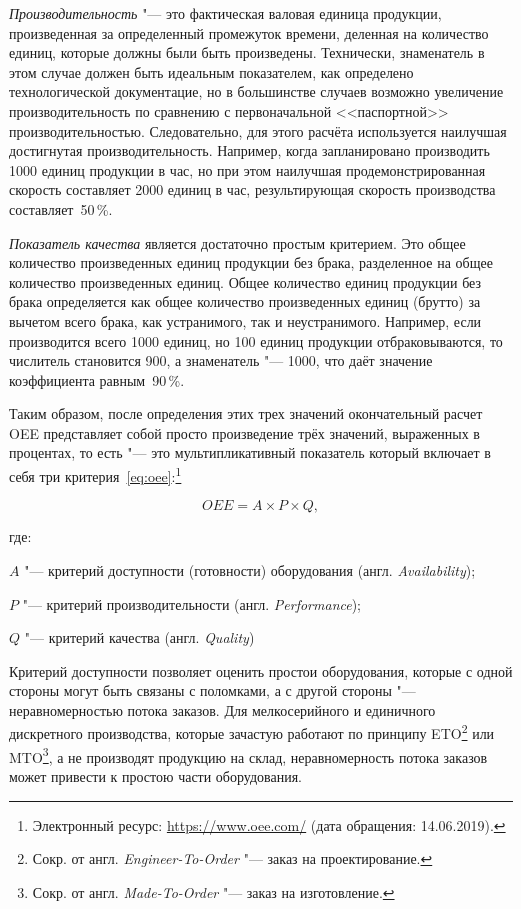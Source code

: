 \textit{Производительность} "--- это фактическая валовая единица продукции, произведенная за определенный промежуток времени, деленная на количество единиц, которые должны были быть произведены. Технически, знаменатель в этом случае должен быть идеальным показателем, как определено технологической документацие, но в большинстве случаев возможно увеличение производительность по сравнению с первоначальной <<паспортной>> производительностью. Следовательно, для этого расчёта используется наилучшая достигнутая производительность. Например, когда запланировано производить 1000 единиц продукции в час, но при этом наилучшая продемонстрированная скорость составляет 2000 единиц в час, результирующая скорость производства составляет~50\,\%.

\textit{Показатель качества} является достаточно простым критерием. Это общее количество произведенных единиц продукции без брака, разделенное на общее количество произведенных единиц. Общее количество единиц продукции без брака определяется как общее количество произведенных единиц (брутто) за вычетом всего брака, как устранимого, так и неустранимого. Например, если производится всего 1000 единиц, но 100 единиц продукции отбраковываются, то числитель становится 900, а знаменатель "--- 1000, что даёт значение коэффициента равным~90\,\%.

Таким образом, после определения этих трех значений окончательный расчет OEE представляет собой просто произведение трёх значений, выраженных в процентах, то есть "--- это мультипликативный показатель который включает в себя три критерия~\cref{eq:oee}:\footnote{Электронный ресурс: \url{https://www.oee.com/} (дата обращения: 14.06.2019).}

\begin{equation}
OEE = A \times P \times Q,
\label{eq:oee}
\end{equation} 

\noindent где:

\noindent $A$ "--- критерий доступности (готовности) оборудования (англ. \textit{Availability});

\noindent $P$ "--- критерий производительности (англ. \textit{Performance});

\noindent $Q$ "--- критерий качества (англ. \textit{Quality})

Критерий доступности позволяет оценить простои оборудования, которые с одной стороны могут быть связаны с поломками, а с другой стороны "--- неравномерностью потока заказов. Для мелкосерийного и единичного дискретного производства, которые зачастую работают по принципу ETO\footnote{Сокр. от англ. \textit{Engineer-To-Order} "--- заказ на проектирование.} или MTO\footnote{Сокр. от англ. \textit{Made-To-Order} "--- заказ на изготовление.}, а не производят продукцию на склад, неравномерность потока заказов может привести к простою части оборудования.

